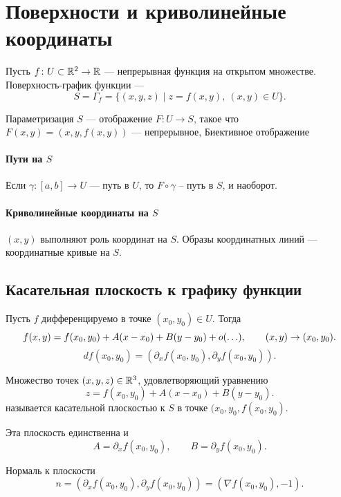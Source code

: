 % 
% 
%
\section{Поверхности и криволинейные координаты}
\begin{defn}
	Пусть $ f \colon U \subset \mathbb{R}^2 \to  \mathbb{R}$ --- непрерывная функция на открытом множестве. {\sf Поверхность-график функции} ---
	\[
	    S = \Gamma _f = \{(x, y, z) \mid z = f(x, y), ~ (x, y) \in U \}
	.\]
\end{defn}
\begin{defn}[Параметризация]
	{\sf Параметризация } $ S$ --- отображение $ F\colon U \to  S$, такое что $ F(x, y) = (x, y, f(x, y))$ --- непрерывное, Биективное отображение
\end{defn}
\paragraph{Пути на $ S$ }
	Если  $ \gamma \colon [a, b] \to  U$ --- путь в $ U$, то  $ F \circ \gamma $ -- путь в $ S$, и наоборот.
\paragraph{Криволинейные координаты на $ S$}
	$ (x, y) $ выполняют роль координат на  $ S$. Образы координатных линий --- координатные кривые на  $ S$.
\subsection{Касательная плоскость к графику функции}
Пусть $ f$  дифференцируемо в точке $ (x_0, y_0) \in U$. Тогда
\[
	f(x, y) = f(x_0, y_0) + A(x-x_0)+B(y-y_0)+o(\ldots ), \qquad (x, y) \to  (x_0, y_0)
.\]
\[
	df(x_0, y_0) = \left( \partial _xf(x_0, y_0), \partial _yf(x_0, y_0) \right)
.\]
\begin{defn}
	Множество точек  $ (x, y, z) \in \mathbb{R}^3$, удовлетворяющий уравнению
\[
	z = f(x_0, y_0) + A(x-x_0) + B(y-y_0)
.\]
называется {\sf касательной плоскостью} к $ S$ в точке  $ (x_0, y_0, f(x_0, y_0)$.
\end{defn}
\begin{note}
Эта плоскость единственна и
	\[
	    A= \partial _xf(x_0, y_0) , \qquad B= \partial _yf(x_0, y_0)
	.\]
\end{note}
\begin{note}
Нормаль к плоскости
	\[
	    n = \left( \partial _xf(x_0, y_0), \partial _yf(x_0, y_0) \right) = \left( \nabla f(x_0, y_0), -1 \right)
	.\]
\end{note}
